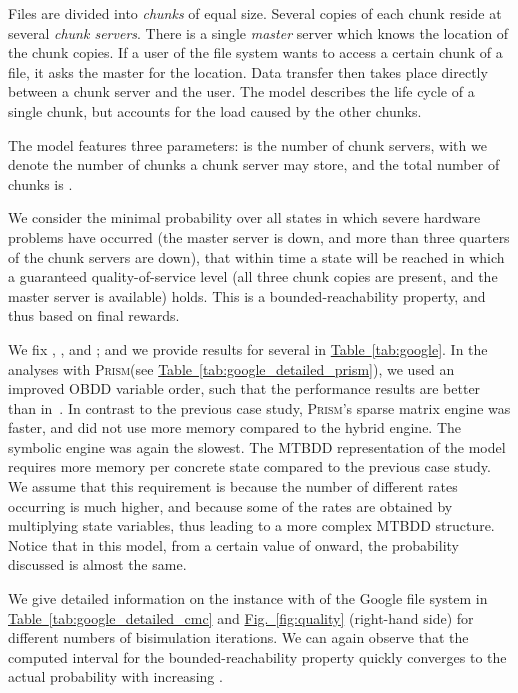 \documentclass[10pt,twocolumn]{article}
\newcommand{\PRISM}{\textsc{Prism}\xspace}
\newcommand{\reffig}[1]{\texorpdfstring{\hyperref[fig:#1]{Fig.~\ref*{fig:#1}}}{Fig.~\ref*{fig:#1}}}
\newcommand{\reftab}[1]{\texorpdfstring{\hyperref[tab:#1]{Table~\ref*{tab:#1}}}{Table~\ref*{tab:#1}}}
\begin{document}
Files are divided into \emph{chunks} of equal size.  Several copies of
each chunk reside at several \emph{chunk servers}.  There is a single
\emph{master} server which knows the location of the chunk copies.  If
a user of the file system wants to access a certain chunk of a file,
it asks the master for the location.  Data transfer then takes place
directly between a chunk server and the user.  The model describes the
life cycle of a single chunk, but accounts for the load caused by the
other chunks.

The model features three parameters:  is the number of chunk
servers, with  we denote the number of chunks a chunk server may
store, and the total number of chunks is .

We consider the minimal probability over all states in which severe
hardware problems have occurred (the master server is down, and more than
three quarters of the chunk servers are down), that within time
 a state will be reached in which a guaranteed
quality-of-service level (all three chunk copies are present, and the
master server is available) holds.  This is a bounded-reachability
property, and thus based on final rewards.

We fix , , and ; and we provide results for
several  in \reftab{google}. In the analyses with \PRISM (see \reftab{google_detailed_prism}), we used
an improved OBDD variable order, such that the performance results are
better than in~\cite{BaierHHHK12}. In contrast
to the previous case study, \PRISM's sparse matrix engine was faster, and
did not use more memory compared to the hybrid engine. The symbolic 
engine was again the slowest. The MTBDD representation of the model 
requires more memory per concrete state compared to the previous case 
study. We assume that this requirement is because the number of different rates 
occurring is much higher, and because some of the rates are obtained by multiplying
state variables, thus leading to a more complex MTBDD structure.
Notice that in this model, from a certain value of  onward, the
probability discussed is almost the same.

We give detailed information on the instance with  of the Google
file system in \reftab{google_detailed_cmc} and \reffig{quality} (right-hand side)
for different numbers  of bisimulation iterations.
We can again observe that the computed interval for the bounded-reachability
property quickly converges to the actual probability with increasing .
\end{document}
